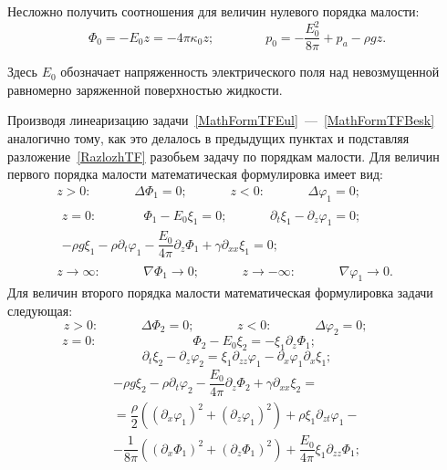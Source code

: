 Несложно получить соотношения для величин нулевого порядка малости:
\begin{equation}
\Phi_{0}=-E_{0}z = - 4 \pi \kappa_{0}z; \qquad \qquad p_{0}=-\dfrac{E_{0}^{2}}{8\pi}+p_{a}-\rho g z.
\end{equation}
	 
Здесь $ E_{0} $  обозначает напряженность электрического поля над невозмущенной равномерно заряженной поверхностью жидкости.

Производя линеаризацию задачи~\eqref{MathFormTFEul}~---~\eqref{MathFormTFBesk} аналогично тому, как это делалось в предыдущих пунктах и подставляя разложение~\eqref{RazlozhTF} разобьем задачу по порядкам малости. Для величин первого порядка малости математическая формулировка имеет вид:
\begin{gather}
z>0: \mspace{60mu} \Delta \Phi_{1}=0; \mspace{60mu} z<0: \mspace{60mu} \Delta \varphi_{1} = 0;\mspace{60mu}\label{MathFormTFEul1}\\
\begin{gathered}
z=0:\mspace{66mu} \Phi_{1}-E_{0}\xi_{1}=0; \mspace{60mu} \partial_{t}\xi_{1}-\partial_{z}\varphi_{1}=0;\mspace{72mu}\\
-\rho g \xi_{1}-\rho \partial_{t}\varphi_{1}-\dfrac{E_{0}}{4 \pi}\partial_{z}\Phi_{1}+\gamma \partial_{xx} \xi_{1}=0;
\end{gathered}\\
z\rightarrow \infty: \mspace{60mu}\nabla \Phi_{1} \rightarrow 0; \mspace{60mu} z\rightarrow - \infty: \mspace{60mu} \nabla \varphi_{1} \rightarrow 0.\mspace{9mu} \label{MathFormTFBesk1}
\end{gather}
Для величин второго порядка малости математическая формулировка задачи следующая:
\begin{equation}
z>0: \mspace{60mu} \Delta \Phi_{2}=0; \mspace{60mu} z<0: \mspace{60mu} \Delta \varphi_{2} = 0;\mspace{60mu}\label{MathFormTFEul2}
\end{equation}
\begin{equation}
z=0:\mspace{135mu} \Phi_{2}-E_{0}\xi_{2}=-\xi_{1} \partial_{z} \Phi_{1};\mspace{135mu}
\label{TFGU1}
\end{equation}
\begin{equation}
  \partial_{t}\xi_{2}-\partial_{z}\varphi_{2}=\xi_{1} \partial_{zz} \varphi_{1}-\partial_{x}\varphi_{1} \partial_{x}\xi_{1};
 \label{TFGU2}
 \end{equation} 
  \begin{multline}
  -\rho g \xi_{2}-\rho \partial_{t}\varphi_{2}-\dfrac{E_{0}}{4 \pi}\partial_{z}\Phi_{2}+\gamma \partial_{xx} \xi_{2}=\\=\dfrac{\rho}{2}\left(\left(\partial_{x}\varphi_{1}\right)^{2}+\left(\partial_{z}\varphi_{1}\right)^{2}\right)+\rho \xi_{1}\partial_{zt}\varphi_{1}-\\-\dfrac{1}{8\pi}\left(\left(\partial_{x}\Phi_{1}\right)^{2}+\left(\partial_{z}\Phi_{1}\right)^{2}\right)+\dfrac{E_{0}}{4 \pi}\xi_{1} \partial_{zz}\Phi_{1};
\label{TFGU3}
\end{multline}
